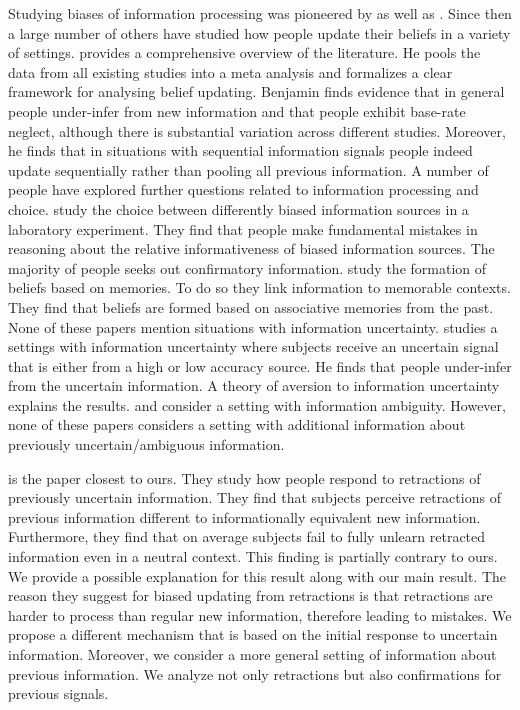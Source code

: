 \documentclass{article}
\begin{document}
Studying biases of information processing was pioneered by \cite{Phillips1966} as well as \cite{Tversky1971, Tversky1974}. Since then a large number of others have studied how people update their beliefs in a variety of settings. \cite{Benjamin2019} provides a comprehensive overview of the literature. He pools the data from all existing studies into a meta analysis and formalizes a clear framework for analysing belief updating. Benjamin finds evidence that in general people under-infer from new information and that people exhibit base-rate neglect, although there is substantial variation across different studies. Moreover, he finds that in situations with sequential information signals people indeed update sequentially rather than pooling all previous information. A number of people have explored further questions related to information processing and choice. \cite{Charness2021} study the choice between differently biased information sources in a laboratory experiment. They find that people make fundamental mistakes in reasoning about the relative informativeness of biased information sources. The majority of people seeks out confirmatory information. \cite{Enke2020} study the formation of beliefs based on memories. To do so they link information to memorable contexts. They find that beliefs are formed based on associative memories from the past. None of these papers mention situations with information uncertainty. \cite{Liang2020} studies a settings with information uncertainty where subjects receive an uncertain signal that is either from a high or low accuracy source. He finds that people under-infer from the uncertain information. A theory of aversion to information uncertainty explains the results. \cite{Epstein2021} and \cite{Shishkin2021} consider a setting with information ambiguity. However, none of these papers considers a setting with additional information about previously uncertain/ambiguous information.

\cite{Goncalves2022} is the paper closest to ours. They study how people respond to retractions of previously uncertain information. They find that subjects perceive retractions of previous information different to informationally equivalent new information. Furthermore, they find that on average subjects fail to fully unlearn retracted information even in a neutral context. This finding is partially contrary to ours. We provide a possible explanation for this result along with our main result. The reason they suggest for biased updating from retractions is that retractions are harder to process than regular new information, therefore leading to mistakes. We propose a different mechanism that is based on the initial response to uncertain information. Moreover, we consider a more general setting of information about previous information. We analyze not only retractions but also confirmations for previous signals.
\end{document}
